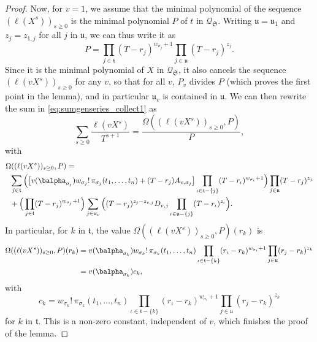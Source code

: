 \documentclass[12pt]{article}
\newcommand{\minpoly}{P}
\newcommand{\lf}{X}
\newcommand{\residueI}{\mathscr{Q}}
\begin{document}
\begin{proof}
  Now, for $v=1$, we assume that the minimal polynomial of the sequence
  $(\ell(\lf^s))_{s \ge 0}$ is the minimal polynomial $\minpoly$ of $t$ in
  $\residueI_\mathfrak{S}$.  Writing $\mathfrak{u}=\mathfrak{u}_1$ and
  $z_j=z_{1,j}$ for all $j$ in $\mathfrak{u}$, we can thus write it as
  $$\minpoly=\prod_{j \in \mathfrak{t}} (T-r_{j})^{w_{\sigma_{j}}+1}
  \prod_{j \in \mathfrak{u}} (T-r_{j})^{z_{j}}.$$ Since it is the
  minimal polynomial of $\lf$ in $\residueI_\mathfrak{S}$, it also cancels the
  sequence $(\ell(v \lf^s))_{s \ge 0}$ for any $v$, so that for all
  $v$, $\minpoly_v$ divides $\minpoly$ (which proves the first point
  in the lemma), and in particular $\mathfrak{u}_v$ is contained in
  $\mathfrak{u}$.
  We can then rewrite the
  sum in \cref{eq:sumgenseries_collect1} as $$ \sum_{s \ge 0} \frac{\ell(v \lf^s)}{T^{s+1}} =\frac{\Omega((\ell(v \lf^s))_{s \ge 0} ,\minpoly)}{\minpoly},$$ with
  \begin{align*}
    & \Omega((\ell(v \lf^s))_{s \ge 0} ,\minpoly)= \\
    &\;\; \sum_{j \in \mathfrak{t}} \Big(\big[
      v(\balpha_{\sigma_{j}})  w_{\sigma_j}!\, \pi_{\sigma_j}(t_1,\dots,t_n)
      + (T-r_j) A_{v,\sigma_j}\big]
    \prod_{\iota \in \mathfrak{t}-\{j\}}(T-r_{\iota} )^{w_{\sigma_{\iota}}+1}
    \Big)\prod_{j \in \mathfrak{u}}(T-r_j )^{z_j}
    \\
    &\;\; +
    \Big(\prod_{j \in \mathfrak{t}}(T-r_{j} )^{w_{\sigma_j}+1}\Big)
    \sum_{j \in \mathfrak{u}_v} \Big (
    (T-r_j)^{z_{j}-z_{v,j}} D_{v,j}
    \prod_{\iota \in \mathfrak{u}-\{j\}}(T-r_{\iota} )^{z_{\iota}}\Big).
  \end{align*}
  In particular, 
  for $k$ in $\mathfrak{t}$,
  the value $\Omega((\ell(v \lf^s))_{s \ge 0} ,\minpoly)(r_k)$ is 
  \begin{align*}
    \Omega((\ell(v \lf^s))_{s \ge 0} ,\minpoly)(r_k)&= v(\balpha_{\sigma_{k}}) w_{\sigma_k}!\, \pi_{\sigma_k}(t_1,\dots,t_n)
    \prod_{\iota \in \mathfrak{t}-\{k\}}(r_\iota-r_{k} )^{w_{\sigma_{\iota}}+1}
    \prod_{j \in \mathfrak{u}}(r_j-r_{k} )^{z_{k}}\\
    &= v(\balpha_{\sigma_{k}}) c_{k},
  \end{align*}
  with 
  $$c_{k}=
  w_{\sigma_k}!\, \pi_{\sigma_k}(t_1,\dots,t_n)
  \prod_{\iota \in \mathfrak{t}-\{k\}}(r_\iota-r_{k} )^{w_{\sigma_{\iota}}+1}
  \prod_{j \in \mathfrak{u}}(r_j-r_{k} )^{z_{k}}$$
  for $k$ in $\mathfrak{t}$. This is a non-zero constant, independent 
  of $v$, which finishes the proof of the lemma.
\end{proof}
\end{document}

